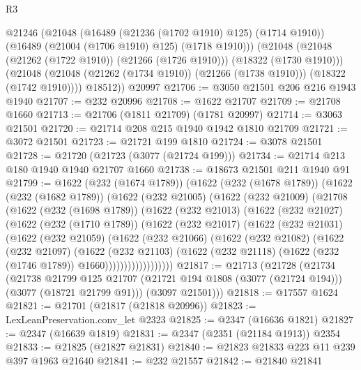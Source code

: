 \begin{lexlean}{R3}
\begin{coremodule}
        @21246
          (@21048
            (@16489 (@21236 (@1702 @1910) @125) (@1714 @1910))
            (@16489 (@21004 (@1706 @1910) @125) (@1718 @1910)))
          (@21048 (@21048 (@21262 (@1722 @1910)) (@21266 (@1726 @1910))) (@18322 (@1730 @1910)))
          (@21048 (@21048 (@21262 (@1734 @1910)) (@21266 (@1738 @1910))) (@18322 (@1742 @1910))))
        @18512))
    @20997
@21706 := @3050 @21501 @206 @216 @1943 @1940
@21707 := @232 @20996
@21708 := @1622 @21707
@21709 := @21708 @1660
@21713 := @21706 (@1811 @21709) (@1781 @20997)
@21714 := @3063 @21501
@21720 := @21714 @208 @215 @1940 @1942 @1810 @21709
@21721 := @3072 @21501
@21723 := @21721 @199 @1810
@21724 := @3078 @21501
@21728 := @21720 (@21723 (@3077 (@21724 @199)))
@21734 := @21714 @213 @180 @1940 @1940 @21707 @1660
@21738 := @18673 @21501 @211 @1940 @91
@21799 := @1622
    (@232 (@1674 @1789))
    (@1622
      (@232 (@1678 @1789))
      (@1622
        (@232 (@1682 @1789))
        (@1622
          (@232 @21005)
          (@1622
            (@232 @21009)
            (@21708
              (@1622
                (@232 (@1698 @1789))
                (@1622
                  (@232 @21013)
                  (@1622
                    (@232 @21027)
                    (@1622
                      (@232 (@1710 @1789))
                      (@1622
                        (@232 @21017)
                        (@1622
                          (@232 @21031)
                          (@1622
                            (@232 @21059)
                            (@1622
                              (@232 @21066)
                              (@1622
                                (@232 @21082)
                                (@1622
                                  (@232 @21097)
                                  (@1622
                                    (@232 @21103)
                                    (@1622
                                      (@232 @21118)
                                      (@1622 (@232 (@1746 @1789)) @1660))))))))))))))))))
@21817 := @21713
    (@21728
      (@21734
        (@21738
          @21799
          @125
          @21707
          (@21721 @194 @1808 (@3077 (@21724 @194)))
          (@3077 (@18721 @21799 @91)))
        (@3097 @21501)))
@21818 := @17557 @1624
@21821 := @21701 (@21817 (@21818 @20996))
@21823 := LexLeanPreservation.conv_let @2323
@21825 := @2347 (@16636 @1821)
@21827 := @2347 (@16639 @1819)
@21831 := @2347 (@2351 (@21184 @1913)) @2354
@21833 := @21825 (@21827 @21831)
@21840 := @21823 @21833 @223 @11 @239 @397 @1963 @21640
@21841 := @232 @21557
@21842 := @21840 @21841

\end{coremodule}
\end{lexlean}
